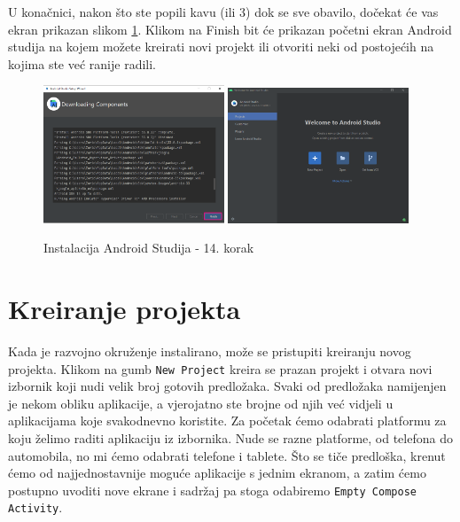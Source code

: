 \documentclass[11pt,a4paper,twoside]{article}
\begin{document}
	U konačnici, nakon što ste popili kavu (ili 3) dok se sve obavilo, dočekat će vas ekran prikazan slikom \ref{fig:install_14}. Klikom na Finish bit će prikazan početni ekran Android studija na kojem možete kreirati novi projekt ili otvoriti neki od postojećih na kojima ste već ranije radili.
	
	\begin{figure}[!h]
		\centering
		\includegraphics[width=0.48\textwidth]{install_14.png}
		\hfill
		\includegraphics[width=0.48\textwidth]{install_15.png}
		\caption{Instalacija Android Studija - 14. korak}
		\label{fig:install_14}	
	\end{figure}


\section{Kreiranje projekta}

	Kada je razvojno okruženje instalirano, može se pristupiti kreiranju novog projekta. Klikom na gumb \texttt{New Project} kreira se prazan projekt i otvara novi izbornik koji nudi velik broj gotovih predložaka. Svaki od predložaka namijenjen je nekom obliku aplikacije, a vjerojatno ste brojne od njih već vidjeli u aplikacijama koje svakodnevno koristite. Za početak ćemo odabrati platformu za koju želimo raditi aplikaciju iz izbornika. Nude se razne platforme, od telefona do automobila, no mi ćemo odabrati telefone i tablete. Što se tiče predloška, krenut ćemo od najjednostavnije moguće aplikacije s jednim ekranom, a zatim ćemo postupno uvoditi nove ekrane i sadržaj pa stoga odabiremo \texttt{Empty Compose Activity}.
	
\end{document}
